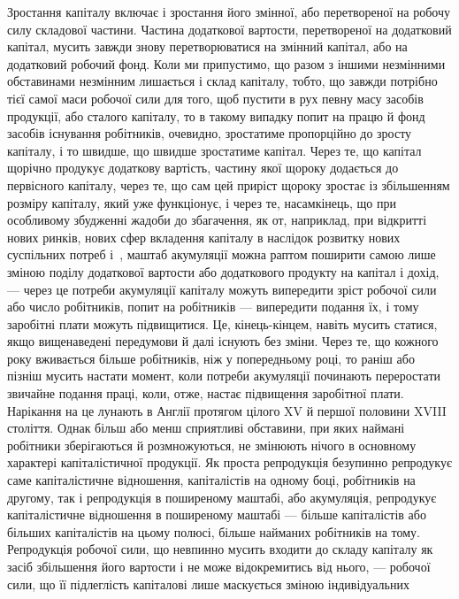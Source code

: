 Зростання капіталу включає і зростання його змінної, або
перетвореної на робочу силу складової частини. Частина додаткової
вартости, перетвореної на додатковий капітал, мусить завжди
знову перетворюватися на змінний капітал, або на додатковий
робочий фонд. Коли ми припустимо, що разом з іншими незмінними
обставинами незмінним лишається і склад капіталу, тобто,
що завжди потрібно тієї самої маси робочої сили для того, щоб
пустити в рух певну масу засобів продукції, або сталого капіталу,
то в такому випадку попит на працю й фонд засобів існування
робітників, очевидно, зростатиме пропорційно до зросту капіталу,
і то швидше, що швидше зростатиме капітал. Через те, що
капітал щорічно продукує додаткову вартість, частину якої
щороку додається до первісного капіталу, через те, що сам цей
приріст щороку зростає із збільшенням розміру капіталу, який
уже функціонує, і через те, насамкінець, що при особливому збудженні
жадоби до збагачення, як от, наприклад, при відкритті
нових ринків, нових сфер вкладення капіталу в наслідок розвитку
нових суспільних потреб і~, маштаб акумуляції можна раптом
поширити самою лише зміною поділу додаткової вартости
або додаткового продукту на капітал і дохід, — через це потреби
акумуляції капіталу можуть випередити зріст робочої сили або
число робітників, попит на робітників — випередити подання
їх, і тому заробітні плати можуть підвищитися. Це, кінець-кінцем,
навіть мусить статися, якщо вищенаведені передумови й
далі існують без зміни. Через те, що кожного року вживається
більше робітників, ніж у попередньому році, то раніш або пізніш
мусить настати момент, коли потреби акумуляції починають
переростати звичайне подання праці, коли, отже, настає підвищення
заробітної плати. Нарікання на це лунають в Англії
протягом цілого XV й першої половини XVIII століття. Однак
більш або менш сприятливі обставини, при яких наймані робітники
зберігаються й розмножуються, не змінюють нічого в основному
характері капіталістичної продукції. Як проста репродукція
безупинно репродукує саме капіталістичне відношення,
капіталістів на одному боці, робітників на другому, так і репродукція
в поширеному маштабі, або акумуляція, репродукує
капіталістичне відношення в поширеному маштабі — більше капіталістів
або більших капіталістів на цьому полюсі, більше
найманих робітників на тому. Репродукція робочої сили, що невпинно
мусить входити до складу капіталу як засіб збільшення
його вартости і не може відокремитись від нього, — робочої сили,
що її підлеглість капіталові лише маскується зміною індивідуальних

